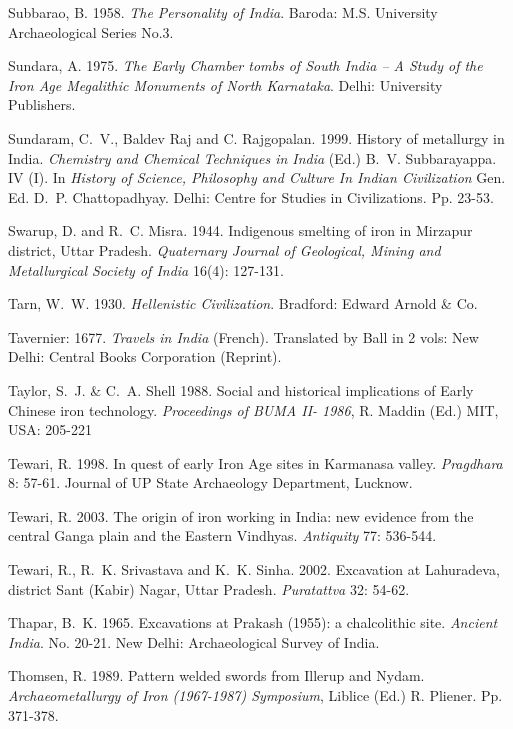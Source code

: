 \begin{thebibliography}{99}
 Subbarao, B. 1958. \textit{The Personality of India}. Baroda: M.S. University Archaeological Series No.3. 

 Sundara, A. 1975. \textit{The Early Chamber tombs of South India – A Study of the Iron Age Megalithic Monuments of North Karnataka}. Delhi: University Publishers. 

 Sundaram, C.~V., Baldev Raj and C. Rajgopalan. 1999. History of metallurgy in India. \textit{Chemistry and Chemical Techniques in India} (Ed.) B.~V. Subbarayappa. IV (I). In \textit{History of Science, Philosophy and Culture In Indian Civilization} Gen. Ed. D.~P. Chattopadhyay. Delhi: Centre for Studies in Civilizations. Pp. 23-53.

 Swarup, D. and R.~C. Misra. 1944. Indigenous smelting of iron in Mirzapur district, Uttar Pradesh. \textit{Quaternary Journal of Geological, Mining and Metallurgical Society of India} 16(4): 127-131. 

 Tarn, W.~W. 1930. \textit{Hellenistic Civilization}. Bradford: Edward Arnold \& Co.

 Tavernier: 1677. \textit{Travels in India} (French). Translated by Ball in 2 vols: New Delhi: Central Books Corporation (Reprint). 

 Taylor, S.~J. \& C.~A. Shell 1988.  Social and historical implications of Early Chinese iron technology. \textit{Proceedings of BUMA II- 1986}, R. Maddin (Ed.) MIT, USA: 205-221

 Tewari, R. 1998. In quest of early Iron Age sites in Karmanasa valley. \textit{Pragdhara} 8: 57-61. Journal of UP State Archaeology Department, Lucknow. 

 Tewari, R. 2003. The origin of iron working in India: new evidence from the central Ganga plain and the Eastern Vindhyas. \textit{Antiquity} 77: 536-544.

 Tewari, R., R.~K. Srivastava and K.~K. Sinha. 2002. Excavation at Lahuradeva, district Sant (Kabir) Nagar, Uttar Pradesh. \textit{Puratattva} 32: 54-62.

 Thapar, B.~K. 1965. Excavations at Prakash (1955): a chalcolithic site. \textit{Ancient India}. No. 20-21. New Delhi: Archaeological Survey of India. 

 Thomsen, R. 1989. Pattern welded swords from Illerup and Nydam. \textit{Archaeometallurgy of Iron (1967-1987) Symposium}, Liblice (Ed.) R. Pliener. Pp. 371-378.


\end{thebibliography}
